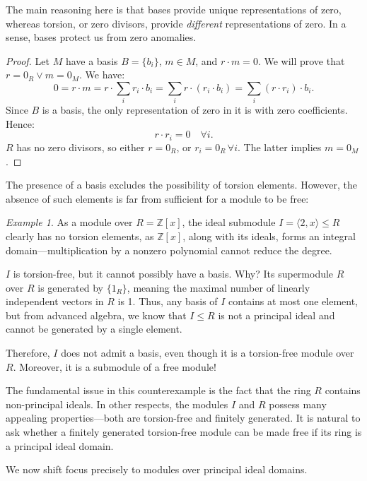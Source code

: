 \documentclass{article}
\newif\ifusemulticols
\theoremstyle{definition}
\theoremstyle{remark}
\newtheorem{example}{Example}[section]
\theoremstyle{plain}
\theoremstyle{plain}
\newenvironment{mymulticols}
    { \ifusemulticols \begin{multicols}{2} \fi }
    { \ifusemulticols \end{multicols} \fi }
\newcommand{\Z}{\mathbb{Z}}
\begin{document}
\begin{mymulticols}
The main reasoning here is that bases provide unique representations of zero, whereas torsion, or
zero divisors, provide \emph{different} representations of zero. In a sense, bases \quotedblbase
protect\quotedblright{} us from zero anomalies.

\begin{proof}
    Let $M$ have a basis $B = \{b_i\}$, $m \in M$, and $r \cdot m = 0$. We will prove that $r = 0_R \lor m = 0_M$. We have:
    $$0 = r \cdot m = r \cdot \sum_i r_i \cdot b_i = \sum_i r \cdot (r_i \cdot b_i) = \sum_i (r \cdot r_i) \cdot b_i.$$
    Since $B$ is a basis, the only representation of zero in it is with zero coefficients. Hence:
    $$r \cdot r_i = 0 \quad \forall i.$$
    $R$ has no zero divisors, so either $r = 0_R$, or $r_i = 0_R \, \forall i$. The latter implies
    $m = 0_M$.
\end{proof}

The presence of a basis excludes the possibility of torsion elements. However, the absence of such
elements is far from sufficient for a module to be free:

\begin{example}
    As a module over $R = \Z[x]$, the ideal submodule $I = \langle 2, x \rangle \le R$ clearly has
    no torsion elements, as $\Z[x]$, along with its ideals, forms an integral domain—multiplication
    by a nonzero polynomial cannot reduce the degree.

    $I$ is torsion-free, but it cannot possibly have a basis. Why?
    Its supermodule $R$ over $R$ is generated by $\{1_R\}$, meaning the maximal number of linearly
    independent vectors in $R$ is 1.
    Thus, any basis of $I$ contains at most one element, but from advanced algebra, we know that $I
    \le R$ is not a principal ideal and cannot be generated by a single element.

    Therefore, $I$ does not admit a basis, even though it is a torsion-free module over $R$.
    Moreover, it is a submodule of a free module!
\end{example}

The fundamental issue in this counterexample is the fact that the ring $R$ contains non-principal ideals.
In other respects, the modules $I$ and $R$ possess many appealing properties—both are torsion-free and finitely generated.
It is natural to ask whether a finitely generated torsion-free module can be made free if its ring
is a principal ideal domain.

We now shift focus precisely to modules over principal ideal domains.


\end{mymulticols}
\end{document}
